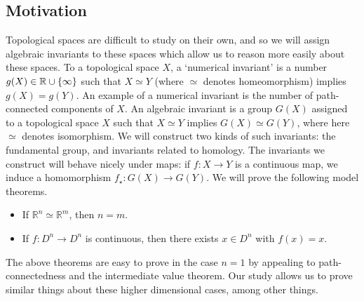 \subsection{Motivation}
Topological spaces are difficult to study on their own, and so we will assign algebraic invariants to these spaces which allow us to reason more easily about these spaces.
To a topological space \( X \), a `numerical invariant' is a number \( g(X) \in \mathbb R \cup \qty{\infty} \) such that \( X \simeq Y \) (where \( \simeq \) denotes homeomorphism) implies \( g(X) = g(Y) \).
An example of a numerical invariant is the number of path-connected components of \( X \).
An algebraic invariant is a group \( G(X) \) assigned to a topological space \( X \) such that \( X \simeq Y \) implies \( G(X) \simeq G(Y) \), where here \( \simeq \) denotes isomorphism.
We will construct two kinds of such invariants: the fundamental group, and invariants related to homology.
The invariants we construct will behave nicely under maps: if \( f \colon X \to Y \) is a continuous map, we induce a homomorphism \( f_\star \colon G(X) \to G(Y) \).
We will prove the following model theorems.
\begin{itemize}
	\item If \( \mathbb R^n \simeq \mathbb R^m \), then \( n = m \).
	\item If \( f \colon D^n \to D^n \) is continuous, then there exists \( x \in D^n \) with \( f(x) = x \).
\end{itemize}
The above theorems are easy to prove in the case \( n = 1 \) by appealing to path-connectedness and the intermediate value theorem.
Our study allows us to prove similar things about these higher dimensional cases, among other things.

